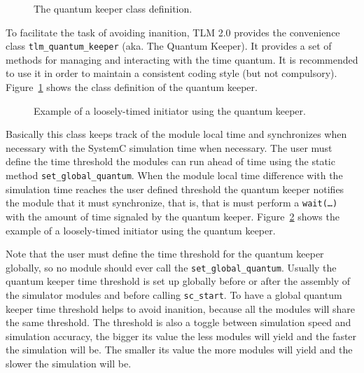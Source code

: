 {\begin{figure}[h]
	
	\caption{The quantum keeper class definition.}
	\label{fig:quantum_keeper_definition}
\end{figure}

To facilitate the task of avoiding inanition, TLM 2.0 provides the convenience class \texttt{tlm\_quantum\_keeper} (aka. The Quantum Keeper).
It provides a set of methods for managing and interacting with the time quantum. 
It is recommended to use it in order to maintain a consistent coding style (but not compulsory).
Figure~\ref{fig:quantum_keeper_definition} shows the class definition of the quantum keeper.

\begin{figure}[h]
	
	\caption{Example of a loosely-timed initiator using the quantum keeper.}
	\label{fig:quantum_keeper_example}
\end{figure}

Basically this class keeps track of the module local time and synchronizes when necessary with the SystemC simulation time when necessary.
The user must define the time threshold the modules can run ahead of time using the static method \texttt{set\_global\_quantum}.
When the module local time difference with the simulation time reaches the user defined threshold the quantum keeper notifies the module that it must synchronize, that is, that is must perform a \texttt{wait(\ldots)} with the amount of time signaled by the quantum keeper.
Figure~\ref{fig:quantum_keeper_example} shows the example of a loosely-timed initiator using the quantum keeper.

Note that the user must define the time threshold for the quantum keeper globally, so no module should ever call the \texttt{set\_global\_quantum}.
Usually the quantum keeper time threshold is set up globally before or after the assembly of the simulator modules and before calling \texttt{sc\_start}.
To have a global quantum keeper time threshold helps to avoid inanition, because all the modules will share the same threshold.
The threshold is also a toggle between simulation speed and simulation accuracy, the bigger its value the less modules will yield and the faster the simulation will be. 
The smaller its value the more modules will yield and the slower the simulation will be.
}
